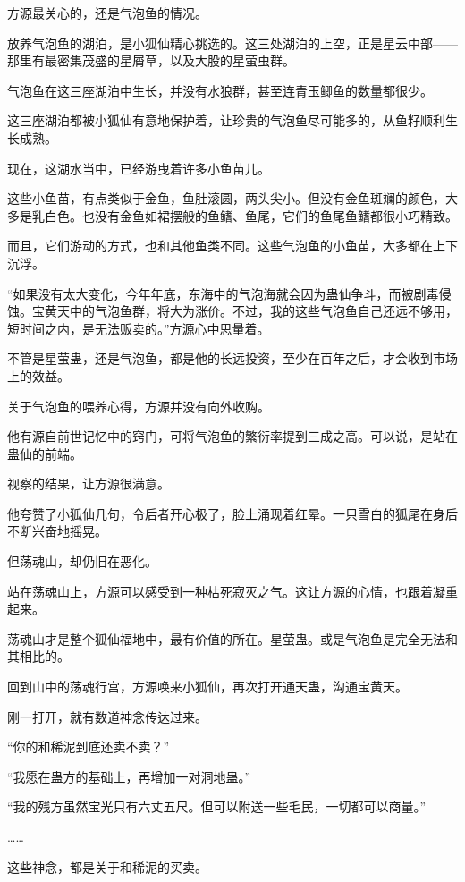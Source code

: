 
\begin{this_body}

方源最关心的，还是气泡鱼的情况。

放养气泡鱼的湖泊，是小狐仙精心挑选的。这三处湖泊的上空，正是星云中部——那里有最密集茂盛的星屑草，以及大股的星萤虫群。

气泡鱼在这三座湖泊中生长，并没有水狼群，甚至连青玉鲫鱼的数量都很少。

这三座湖泊都被小狐仙有意地保护着，让珍贵的气泡鱼尽可能多的，从鱼籽顺利生长成熟。

现在，这湖水当中，已经游曳着许多小鱼苗儿。

这些小鱼苗，有点类似于金鱼，鱼肚滚圆，两头尖小。但没有金鱼斑斓的颜色，大多是乳白色。也没有金鱼如裙摆般的鱼鳍、鱼尾，它们的鱼尾鱼鳍都很小巧精致。

而且，它们游动的方式，也和其他鱼类不同。这些气泡鱼的小鱼苗，大多都在上下沉浮。

“如果没有太大变化，今年年底，东海中的气泡海就会因为蛊仙争斗，而被剧毒侵蚀。宝黄天中的气泡鱼群，将大为涨价。不过，我的这些气泡鱼自己还远不够用，短时间之内，是无法贩卖的。”方源心中思量着。

不管是星萤蛊，还是气泡鱼，都是他的长远投资，至少在百年之后，才会收到市场上的效益。

关于气泡鱼的喂养心得，方源并没有向外收购。

他有源自前世记忆中的窍门，可将气泡鱼的繁衍率提到三成之高。可以说，是站在蛊仙的前端。

视察的结果，让方源很满意。

他夸赞了小狐仙几句，令后者开心极了，脸上涌现着红晕。一只雪白的狐尾在身后不断兴奋地摇晃。

但荡魂山，却仍旧在恶化。

站在荡魂山上，方源可以感受到一种枯死寂灭之气。这让方源的心情，也跟着凝重起来。

荡魂山才是整个狐仙福地中，最有价值的所在。星萤蛊。或是气泡鱼是完全无法和其相比的。

回到山中的荡魂行宫，方源唤来小狐仙，再次打开通天蛊，沟通宝黄天。

刚一打开，就有数道神念传达过来。

“你的和稀泥到底还卖不卖？”

“我愿在蛊方的基础上，再增加一对洞地蛊。”

“我的残方虽然宝光只有六丈五尺。但可以附送一些毛民，一切都可以商量。”

……

这些神念，都是关于和稀泥的买卖。


\end{this_body}
